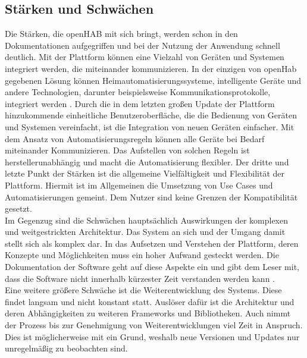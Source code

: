 \subsection{Stärken und Schwächen}
    Die Stärken, die openHAB mit sich bringt, werden schon in den Dokumentationen aufgegriffen und bei der Nutzung der Anwendung 
    schnell deutlich. Mit der Plattform können eine Vielzahl von Geräten und Systemen integriert werden, die miteinander 
    kommunizieren. In der einzigen von openHab gegebenen Lösung können Heimautomatisierungssysteme, intelligente Geräte und 
    andere Technologien, darunter beispielsweise Kommunikationsprotokolle, integriert werden \cite{openhab-strength}. Durch die in 
    dem letzten großen Update der Plattform hinzukommende einheitliche Benutzeroberfläche, die die Bedienung von Geräten und 
    Systemen vereinfacht, ist die Integration von neuen Geräten einfacher. Mit dem Ansatz von 
    Automatisierungsregeln können alle Geräte bei Bedarf miteinander Kommunizieren. Das Aufstellen von solchen Regeln ist 
    herstellerunabhängig und macht die Automatisierung flexibler. Der dritte und letzte Punkt der Stärken ist die allgemeine 
    Vielfältigkeit und Flexibilität der Plattform. Hiermit ist im Allgemeinen die Umsetzung von Use Cases und Automatisierungen 
    gemeint. Dem Nutzer sind keine Grenzen der Kompatibilität gesetzt.
    \\
    \linebreak
    Im Gegenzug sind die Schwächen hauptsächlich Auswirkungen der komplexen und weitgestrickten Architektur. Das System an sich 
    und der Umgang damit stellt sich als komplex dar. In das Aufsetzen und Verstehen der Plattform, deren Konzepte und 
    Möglichkeiten muss ein hoher Aufwand gesteckt werden. Die Dokumentation der Software geht auf diese Aspekte ein und gibt dem 
    Leser mit, dass die Software nicht innerhalb kürzester Zeit verstanden werden kann \cite{openhab-strength}. 
    \\
    Eine weitere größere Schwäche ist die Weiterentwicklung des Systems. Diese findet langsam und nicht konstant statt. Auslöser 
    dafür ist die Architektur und deren Abhängigkeiten zu weiteren Frameworks und Bibliotheken. Auch nimmt der Prozess bis zur 
    Genehmigung von Weiterentwicklungen viel Zeit in Anspruch. Dies ist möglicherweise mit ein Grund, weshalb neue Versionen und 
    Updates nur unregelmäßig zu beobachten sind. 

